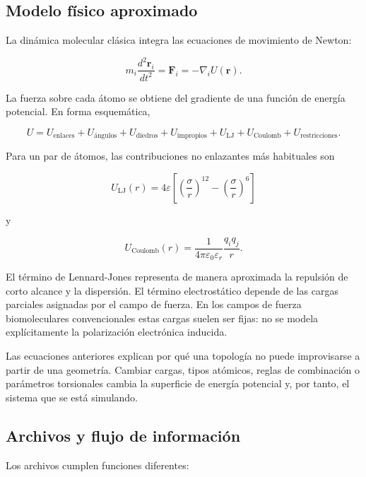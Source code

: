 \documentclass[
  spanish,
  11pt,
  a4paper]{article}
\begin{document}
\subsection{Modelo físico aproximado}\label{modelo-fuxedsico-aproximado}

La dinámica molecular clásica integra las ecuaciones de movimiento de
Newton:

\[
m_i\frac{d^2\mathbf r_i}{dt^2}
=
\mathbf F_i
=
-\nabla_i U(\mathbf r).
\]

La fuerza sobre cada átomo se obtiene del gradiente de una función de
energía potencial. En forma esquemática,

\[
U =
U_{\mathrm{enlaces}}
+U_{\mathrm{ángulos}}
+U_{\mathrm{diedros}}
+U_{\mathrm{impropios}}
+U_{\mathrm{LJ}}
+U_{\mathrm{Coulomb}}
+U_{\mathrm{restricciones}}.
\]

Para un par de átomos, las contribuciones no enlazantes más habituales
son

\[
U_{\mathrm{LJ}}(r)
=
4\varepsilon
\left[
\left(\frac{\sigma}{r}\right)^{12}
-
\left(\frac{\sigma}{r}\right)^6
\right]
\]

y

\[
U_{\mathrm{Coulomb}}(r)
=
\frac{1}{4\pi\varepsilon_0\varepsilon_r}
\frac{q_iq_j}{r}.
\]

El término de Lennard-Jones representa de manera aproximada la repulsión
de corto alcance y la dispersión. El término electrostático depende de
las cargas parciales asignadas por el campo de fuerza. En los campos de
fuerza biomoleculares convencionales estas cargas suelen ser fijas: no
se modela explícitamente la polarización electrónica inducida.

Las ecuaciones anteriores explican por qué una topología no puede
improvisarse a partir de una geometría. Cambiar cargas, tipos atómicos,
reglas de combinación o parámetros torsionales cambia la superficie de
energía potencial y, por tanto, el sistema que se está simulando.

\subsection{Archivos y flujo de
información}\label{archivos-y-flujo-de-informaciuxf3n}

Los archivos cumplen funciones diferentes:
\end{document}
